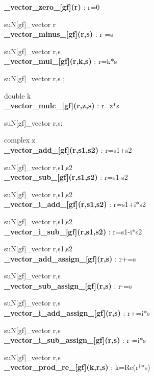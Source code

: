 \documentclass[10pt]{article}
\begin{document}
\noindent\textbf{\_vector\_zero\_[gf](r) } : r=0

suN[gf]\_vector r \\


\noindent\textbf{\_vector\_minus\_[gf](r,s) } : r-=s

suN[gf]\_vector r,s \\


\noindent\textbf{\_vector\_mul\_[gf](r,k,s) } : r=k$*$s

suN[gf]\_vector r,s ;

double k\\


\noindent\textbf{\_vector\_mulc\_[gf](r,z,s) } : r=z$*$s

suN[gf]\_vector r,s;

complex z\\


\noindent\textbf{\_vector\_add\_[gf](r,s1,s2) } : r=s1+s2

suN[gf]\_vector r,s1,s2\\


\noindent\textbf{\_vector\_sub\_[gf](r,s1,s2) } : r=s1-s2

suN[gf]\_vector r,s1,s2\\


\noindent\textbf{\_vector\_i\_add\_[gf](r,s1,s2) } : r=s1+i$*$s2

suN[gf]\_vector r,s1,s2\\


\noindent\textbf{\_vector\_i\_sub\_[gf](r,s1,s2) } : r=s1-i$*$s2

suN[gf]\_vector r,s1,s2\\


\noindent\textbf{\_vector\_add\_assign\_[gf](r,s) } : r+=s

suN[gf]\_vector r,s\\


\noindent\textbf{\_vector\_sub\_assign\_[gf](r,s) } : r-=s

suN[gf]\_vector r,s\\


\noindent\textbf{\_vector\_i\_add\_assign\_[gf](r,s) } : r+=i$*$s

suN[gf]\_vector r,s\\


\noindent\textbf{\_vector\_i\_sub\_assign\_[gf](r,s) } : r-=i$*$s

suN[gf]\_vector r,s\\


\noindent\textbf{\_vector\_prod\_re\_[gf](k,r,s) } : k=Re(r$^\dagger$$*$s)
\end{document}
